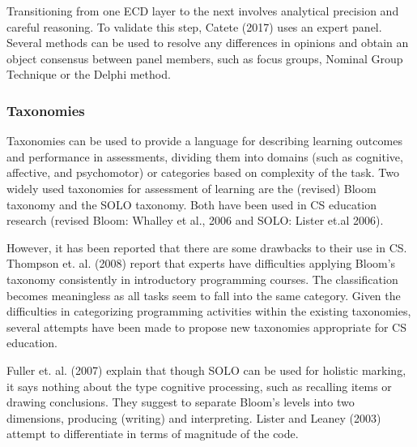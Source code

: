 Transitioning from one ECD layer to the next involves analytical precision and careful reasoning. To validate this step, Catete (2017) uses an expert panel. Several methods can be used to resolve any differences in opinions and obtain an object consensus between panel members, such as focus groups, Nominal Group Technique or the Delphi method.









\subsubsection*{Taxonomies}

Taxonomies can be used to provide a language for describing learning outcomes and
performance in assessments, dividing them into domains (such as cognitive, affective, and psychomotor) or categories based on complexity of the task. Two widely used taxonomies for assessment of learning are the (revised) Bloom
taxonomy and the SOLO taxonomy. Both have been used in CS education research (revised Bloom: Whalley et al., 2006 and SOLO: Lister et.al 2006).


However, it has been reported that there are some drawbacks to their use in CS. Thompson et. al. (2008) report that experts have difficulties applying Bloom's taxonomy consistently in introductory programming courses. The classification becomes meaningless as all tasks seem to fall into the same category. Given the difficulties in categorizing programming activities within the existing taxonomies, several attempts have been made to propose new taxonomies appropriate for CS education.

 Fuller et. al. (2007) explain that though SOLO can be used for holistic marking, it says nothing about the type cognitive processing, such as recalling items or drawing conclusions. They suggest to separate Bloom’s levels into two dimensions, producing (writing) and interpreting. Lister and Leaney (2003) attempt to differentiate in terms of magnitude of the code.

